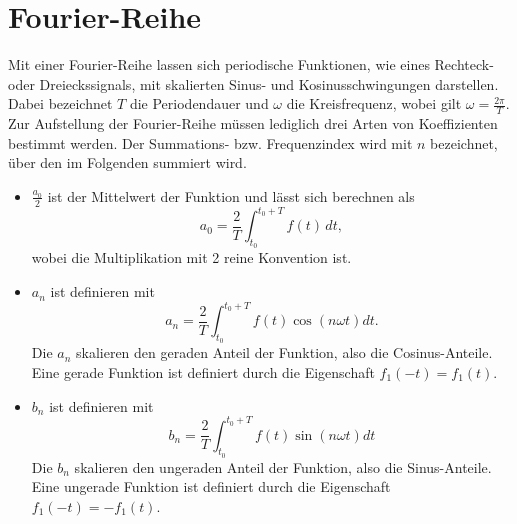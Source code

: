 %
%
%
%

\section{Fourier-Reihe\label{fourier:section:GrundlagenFourierAnalyse}}


Mit einer Fourier-Reihe lassen sich periodische Funktionen, wie eines Rechteck- oder Dreieckssignals, mit skalierten Sinus- und Kosinusschwingungen darstellen.  
Dabei bezeichnet $T$ die Periodendauer und $\omega$ die Kreisfrequenz, wobei gilt $\omega = \frac{2\pi}{T}$.
Zur Aufstellung der Fourier-Reihe müssen lediglich drei Arten von Koeffizienten bestimmt werden. 
Der Summations- bzw. Frequenzindex wird mit $n$ bezeichnet, über den im Folgenden summiert wird.




\begin{itemize}
	
	\item $\frac{a_0}{2}$ ist der Mittelwert der Funktion und lässt sich berechnen als
	\begin{equation}
		a_0 = \frac{2}{T} \int_{t_0}^{t_0 + T} f(t) \, dt,
	\end{equation}
	wobei die Multiplikation mit 2 reine Konvention ist.
	
	\item $a_n$ ist definieren mit 
	\begin{equation}
		a_n = \frac{2}{T} \int_{t_0}^{t_0 + T} f(t) \cos\left(n\omega t\right) dt.
	\end{equation}
	Die $a_n$ skalieren den geraden Anteil der Funktion, also die Cosinus-Anteile. 
	Eine gerade Funktion ist definiert durch die Eigenschaft $f_1(-t) = f_1(t)$. 
	
	
	\item $b_n$ ist definieren mit 
	\begin{equation}
		b_n = \frac{2}{T} \int_{t_0}^{t_0 + T} f(t) \sin\left(n\omega t\right) dt
	\end{equation}
	Die $b_n$ skalieren den ungeraden Anteil der Funktion, also die Sinus-Anteile. 
	Eine ungerade Funktion ist definiert durch die Eigenschaft $f_1(-t) = -f_1(t)$. 
	
\end{itemize}



